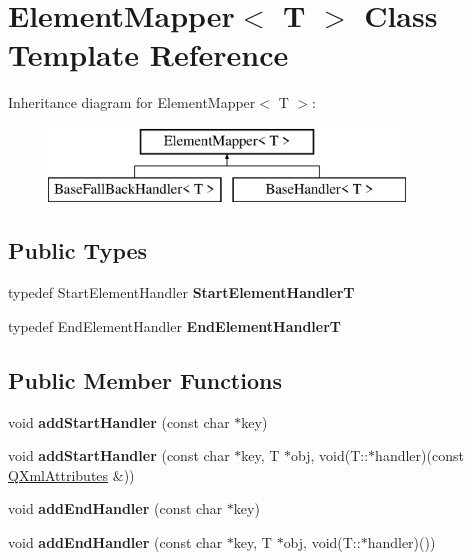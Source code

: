 \hypertarget{class_element_mapper}{}\section{Element\+Mapper$<$ T $>$ Class Template Reference}
\label{class_element_mapper}
Inheritance diagram for Element\+Mapper$<$ T $>$\+:\begin{figure}[H]
\begin{center}
\leavevmode
\includegraphics[height=2.000000cm]{class_element_mapper}
\end{center}
\end{figure}
\subsection*{Public Types}
\begin{DoxyCompactItemize}
\item 
\mbox{\label{class_element_mapper_afca37050650c0a9d475f4c87b9189eac}} 
typedef Start\+Element\+Handler {\bfseries Start\+Element\+HandlerT}
\item 
\mbox{\label{class_element_mapper_a3d3ef233834e26837676018b71f5d1aa}} 
typedef End\+Element\+Handler {\bfseries End\+Element\+HandlerT}
\end{DoxyCompactItemize}
\subsection*{Public Member Functions}
\begin{DoxyCompactItemize}
\item 
\mbox{\label{class_element_mapper_a8cb3260e99bb20970dd7a295d5553b70}} 
void {\bfseries add\+Start\+Handler} (const char $\ast$key)
\item 
\mbox{\label{class_element_mapper_a3dee79deae8ce5172e558679385032ed}} 
void {\bfseries add\+Start\+Handler} (const char $\ast$key, T $\ast$obj, void(T\+::$\ast$handler)(const \mbox{\hyperlink{class_q_xml_attributes}{Q\+Xml\+Attributes}} \&))
\item 
\mbox{\label{class_element_mapper_accc283d02d0481be43a98662006ca80a}} 
void {\bfseries add\+End\+Handler} (const char $\ast$key)
\item 
\mbox{\label{class_element_mapper_a7d2ce3844784f2040576adbdfe55068d}} 
void {\bfseries add\+End\+Handler} (const char $\ast$key, T $\ast$obj, void(T\+::$\ast$handler)())
\end{DoxyCompactItemize}
